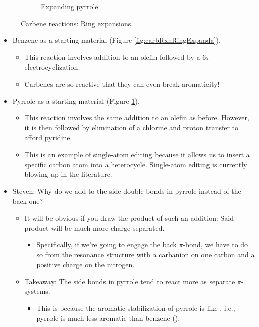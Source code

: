 \documentclass[../notes.tex]{subfiles}
\begin{document}
\begin{itemize}
\begin{figure}[h!]
\begin{subfigure}[b]{\linewidth}
            \caption{Expanding pyrrole.}
            \label{fig:carbRxnRingExpandb}
        \end{subfigure}
        \caption{Carbene reactions: Ring expansions.}
        \label{fig:carbRxnRingExpand}
    \end{figure}
    \begin{itemize}
        \item Benzene as a starting material (Figure \ref{fig:carbRxnRingExpanda}).
        \begin{itemize}
            \item This reaction involves addition to an olefin followed by a $6\pi$ electrocyclization.
            \item Carbenes are so reactive that they can even break aromaticity!
        \end{itemize}
        \item Pyrrole as a starting material (Figure \ref{fig:carbRxnRingExpandb}).
        \begin{itemize}
            \item This reaction involves the same addition to an olefin as before. However, it is then followed by elimination of a chlorine and proton transfer to afford pyridine.
            \item This is an example of single-atom editing because it allows us to insert a specific carbon atom into a heterocycle. Single-atom editing is currently blowing up in the literature.
        \end{itemize}
        \item Steven: Why do we add to the side double bonds in pyrrole instead of the back one?
        \begin{itemize}
            \item It will be obvious if you draw the product of such an addition: Said product will be much more charge separated.
            \begin{itemize}
                \item Specifically, if we're going to engage the back $\pi$-bond, we have to do so from the resonance structure with a carbanion on one carbon and a positive charge on the nitrogen.
            \end{itemize}
            \item Takeaway: The side bonds in pyrrole tend to react more as separate $\pi$-systems.
            \begin{itemize}
                \item This is because the aromatic stabilization of pyrrole is like , i.e., pyrrole is much less aromatic than benzene ().

\end{itemize}
\end{itemize}
\end{itemize}
\end{itemize}
\end{document}
